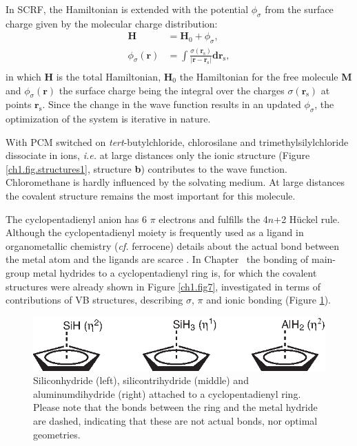 In SCRF, the Hamiltonian is extended with the potential $\phi_\sigma$ from the surface charge given by the molecular charge distribution:
\begin{equation}
\begin{split}
\mathbf{H}&=\mathbf{H}_0 + \phi_\sigma,\\
\phi_\sigma(\mathbf{r})&=\int\frac{\sigma(\mathbf{r}_\mathrm{s})}{|\mathbf{r}-\mathbf{r}_\mathrm{s}|}\mathbf{dr}_\mathrm{s},\\
\end{split}
\end{equation}
in which $\mathbf{H}$ is the total Hamiltonian, $\mathbf{H}_0$ the Hamiltonian for the free molecule \textbf{M} and $\phi_\sigma(\mathbf{r})$ the surface charge being the integral over the charges $\sigma(\mathbf{r}_\mathrm{s})$ at points $\mathbf{r}_\mathrm{s}$. Since the change in the wave function results in an updated $\phi_\sigma$, the optimization of the system is iterative in nature.

With PCM switched on \textit{tert}-butylchloride, chlorosilane and trimethylsilylchloride dissociate in ions, \textit{i.e.} at large distances only the ionic structure (Figure \ref{ch1.fig.structures1}, structure \textbf{b}) contributes to the wave function.  Chloromethane is hardly influenced by the solvating medium. At large distances the covalent structure remains the most important for this molecule.  

The cyclopentadienyl anion has 6 $\pi$ electrons and fulfills the 4$n$+2 H\"{u}ckel rule. Although the cyclopentadienyl moiety is frequently used as a ligand in organometallic chemistry (\textit{cf.} ferrocene) details about the actual bond between the metal atom and the ligands are scarce \cite{budzelaar}. In Chapter \chcyclopentadienyl\ the bonding of main-group metal hydrides to a cyclopentadienyl ring is, for which the covalent structures were already shown in Figure \ref{ch1.fig7}, investigated in terms of contributions of VB structures, describing $\sigma$, $\pi$ and ionic bonding (Figure \ref{ch1.fig.mhydride}).
\begin{figure}[ht]
\center
\includegraphics{introduction/figures/mhydride.eps}
\caption{Siliconhydride (left), silicontrihydride (middle) and aluminumdihydride (right) attached to a cyclopentadienyl ring. Please note that the bonds between the ring and the metal hydride are dashed, indicating that these are not actual bonds, nor optimal geometries.}
\label{ch1.fig.mhydride}
\end{figure}

